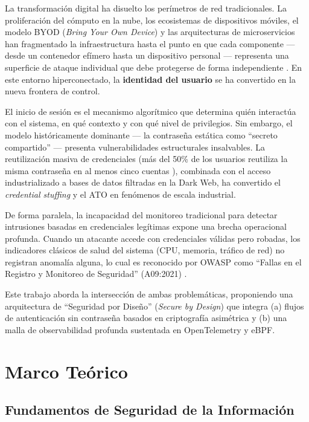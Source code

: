 \documentclass[12pt, a4paper]{article}
\begin{document}
La transformación digital ha disuelto los perímetros de red tradicionales. La
proliferación del cómputo en la nube, los ecosistemas de dispositivos móviles, el
modelo BYOD (\textit{Bring Your Own Device}) y las arquitecturas de
microservicios han fragmentado la infraestructura hasta el punto en que cada
componente --- desde un contenedor efímero hasta un dispositivo personal ---
representa una superficie de ataque individual que debe protegerse de forma
independiente \cite{zerotrust2025}. En este entorno hiperconectado, la
\textbf{identidad del usuario} se ha convertido en la nueva frontera de control.

El inicio de sesión es el mecanismo algorítmico que determina quién interactúa
con el sistema, en qué contexto y con qué nivel de privilegios. Sin embargo, el
modelo históricamente dominante --- la contraseña estática como ``secreto
compartido'' --- presenta vulnerabilidades estructurales insalvables. La
reutilización masiva de credenciales (más del 50\% de los usuarios reutiliza la
misma contraseña en al menos cinco cuentas \cite{frontegg2025}), combinada con
el acceso industrializado a bases de datos filtradas en la Dark Web, ha
convertido el \textit{credential stuffing} y el ATO en fenómenos de escala
industrial.

De forma paralela, la incapacidad del monitoreo tradicional para detectar
intrusiones basadas en credenciales legítimas expone una brecha operacional
profunda. Cuando un atacante accede con credenciales válidas pero robadas, los
indicadores clásicos de salud del sistema (CPU, memoria, tráfico de red) no
registran anomalía alguna, lo cual es reconocido por OWASP como ``Fallas en el
Registro y Monitoreo de Seguridad'' (A09:2021) \cite{owasptop10}.

Este trabajo aborda la intersección de ambas problemáticas, proponiendo una
arquitectura de ``Seguridad por Diseño'' (\textit{Secure by Design})
\cite{owaspSBD} que integra (a) flujos de autenticación sin contraseña basados
en criptografía asimétrica y (b) una malla de observabilidad profunda
sustentada en OpenTelemetry y eBPF.

\section{Marco Teórico}

\subsection{Fundamentos de Seguridad de la Información}
\end{document}
